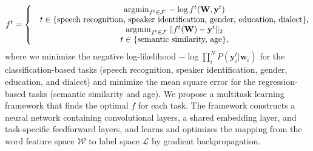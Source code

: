 \documentclass{article}
\begin{document}
\begin{align}
f^t = \left\{\begin{matrix}
& \mathrm{argmin}_{f^t \in \mathcal{F}}\, -\log{f^t(\mathbf{W},\mathbf{y}^t)} \\
& t \in \{\textup{speech recognition, speaker identification, gender, education, dialect}\}, \\
& \mathrm{argmin}_{f^t \in \mathcal{F}}\, \|f^t(\mathbf{W}) - \mathbf{y}^t\|_2 \\
& t \in \{\textup{semantic similarity, age}\},
\end{matrix}
\right.
\end{align}
where we minimize the negative log-likelihood $-\log{\prod_{i}^{N}{P(\mathbf{y}_i^t|\mathbf{w}_i)}}$ for the classification-based tasks (speech recognition, speaker identification, gender, education, and dialect) and minimize the mean square error for the regression-based tasks (semantic similarity and age). We propose a multitask learning framework that finds the optimal $f$ for each task. The framework constructs a neural network containing convolutional layers, a shared embedding layer, and task-specific feedforward layers, and learns and optimizes the mapping from the word feature space $\mathcal{W}$ to label space $\mathcal{L}$ by gradient backpropagation.
\end{document}

